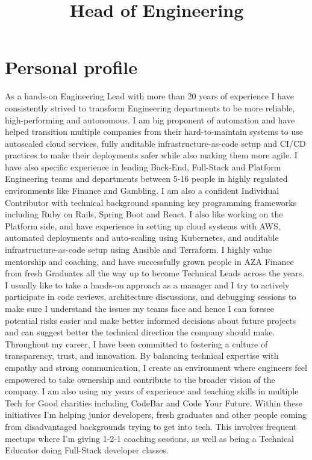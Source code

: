 \documentclass[10pt,a4paper,roman]{moderncv}
\title{Head of Engineering}
\begin{document}
\makecvtitle

\section{Personal profile}
As a hands-on Engineering Lead with more than 20 years of experience I have consistently strived to transform Engineering departments to be more reliable, high-performing and autonomous. I am big proponent of automation and have helped transition multiple companies from their hard-to-maintain systems to use autoscaled cloud services, fully auditable infrastructure-as-code setup and CI/CD practices to make their deployments safer while also making them more agile. I have also specific experience in leading Back-End, Full-Stack and Platform Engineering teams and departments between 5-16 people in highly regulated environments like Finance and Gambling.
\hfill\break
\hfill\break
I am also a confident Individual Contributor with technical background spanning key programming frameworks including Ruby on Rails, Spring Boot and React. I also like working on the Platform side, and have experience in setting up cloud systems with AWS, automated deployments and auto-scaling using Kubernetes, and auditable infrastructure-as-code setup using Ansible and Terraform.
\hfill\break
\hfill\break
I highly value mentorship and coaching, and have successfully grown people in AZA Finance from fresh Graduates all the way up to become Technical Leads across the years. I usually like to take a hands-on approach as a manager and I try to actively participate in code reviews, architecture discussions, and debugging sessions to make sure I understand the issues my teams face and hence I can foresee potential risks easier and make better informed decisions about future projects and can suggest better the technical direction the company should make.
\hfill\break
\hfill\break
Throughout my career, I have been committed to fostering a culture of transparency, trust, and innovation. By balancing technical expertise with empathy and strong communication, I create an environment where engineers feel empowered to take ownership and contribute to the broader vision of the company.
\hfill\break
\hfill\break
I am also using my years of experience and teaching skills in multiple Tech for Good charities including CodeBar and Code Your Future. Within these initiatives I'm helping junior developers, fresh graduates and other people coming from disadvantaged backgrounds trying to get into tech. This involves frequent meetups where I'm giving 1-2-1 coaching sessions, as well as being a Technical Educator doing Full-Stack developer classes.
\end{document}
